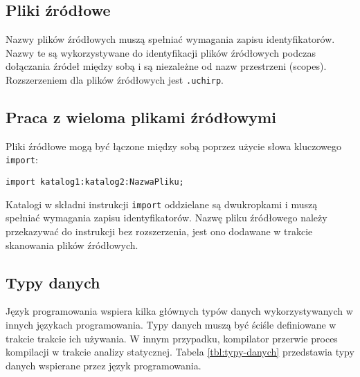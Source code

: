 \subsection{Pliki źródłowe}
Nazwy plików źródłowych muszą spełniać wymagania zapisu identyfikatorów. Nazwy te są wykorzystywane do identyfikacji plików źródłowych podczas dołączania źródeł między sobą i są niezależne od nazw przestrzeni (scopes). Rozszerzeniem dla plików źródłowych jest \lstinline|.uchirp|.

\subsection{Praca z wieloma plikami źródłowymi}
Pliki źródłowe mogą być łączone między sobą poprzez użycie słowa kluczowego \lstinline|import|:
\begin{lstlisting}
import katalog1:katalog2:NazwaPliku;
\end{lstlisting}
Katalogi w składni instrukcji \lstinline|import| oddzielane są dwukropkami  i muszą spełniać wymagania zapisu identyfikatorów. Nazwę pliku źródłowego należy przekazywać do instrukcji bez rozszerzenia, jest ono dodawane w trakcie skanowania plików źródłowych. 

\subsection{Typy danych}
Język programowania wspiera kilka głównych typów danych wykorzystywanych w innych językach programowania. Typy danych muszą być ściśle definiowane w trakcie trakcie ich używania. W innym przypadku, kompilator przerwie proces kompilacji w trakcie analizy statycznej. Tabela \ref{tbl:typy-danych} przedstawia typy danych wspierane przez język programowania.

